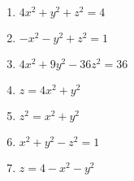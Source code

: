 \documentclass[12pt]{article}
\newif\ifans
\begin{document}
\begin{enumerate}

\item $4x^2+y^2+z^2=4$

\ifans{\fbox{\parbox{0.45\linewidth}{\begin{center}Ellipsoid\\\texttt{[image: ellipsoid.pdf]}\end{center}}}} \fi

\item $-x^2-y^2+z^2=1$

\ifans{\fbox{\parbox{0.45\linewidth}{\begin{center}Hyperboloid of 2 Sheets\\\texttt{[image: hyperboloid2.pdf]}\end{center}}}} \fi

\item $4x^2+9y^2-36z^2=36$

\ifans{\fbox{\parbox{0.45\linewidth}{\begin{center}Hyperboloid of 1 Sheet\\\texttt{[image: hyperboloid1.pdf]}\end{center}}}} \fi

\item $z=4x^2+y^2$

\ifans{\fbox{\parbox{0.45\linewidth}{\begin{center}Elliptic Paraboloid\\\texttt{[image: paraboloid3.pdf]}\end{center}}}} \fi

\item $z^2=x^2+y^2$

\ifans{\fbox{\parbox{0.45\linewidth}{\begin{center}Circular Double Cone\\\texttt{[image: cone1.pdf]}\end{center}}}} \fi

\item $x^2+y^2-z^2=1$

\ifans{\fbox{\parbox{0.45\linewidth}{\begin{center}Hyperboloid of 1 Sheet\\\texttt{[image: hyperboloid.pdf]}\end{center}}}} \fi

\item $z=4-x^2-y^2$

\ifans{\fbox{\parbox{0.45\linewidth}{\begin{center}Circular Paraboloid\\\texttt{[image: paraboloid4.pdf]}\end{center}}}} \fi


\end{enumerate}
\end{document}
